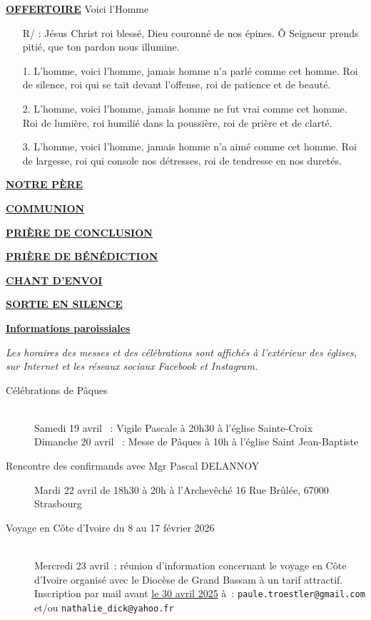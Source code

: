 \documentclass[11pt,a4paper]{article}
\newcommand{\NewsItem}[1]{%
\vspace{3pt}
\underline{\textbf{#1}}
		  }
\begin{document}
\NewsItem{OFFERTOIRE} Voici l'Homme
\begin{itemize}
\item[R/] : Jésus Christ roi blessé, Dieu couronné de nos épines.
Ô Seigneur prends pitié, que ton pardon nous illumine.
\item[1.] L’homme, voici l’homme, jamais homme n’a parlé comme cet homme.
Roi de silence, roi qui se tait devant l’offense, roi de patience et de beauté.
\item[2.] L’homme, voici l’homme, jamais homme ne fut vrai comme cet homme.
Roi de lumière, roi humilié dans la poussière, roi de prière et de clarté.
\item[3.] L’homme, voici l’homme, jamais homme n’a aimé comme cet homme.
Roi de largesse, roi qui console nos détresses, roi de tendresse en nos duretés.
\end{itemize}

\NewsItem{NOTRE PÈRE}


\begin{framed}
\NewsItem{COMMUNION} 
\end{framed}

\NewsItem{PRIÈRE DE CONCLUSION}

\NewsItem{PRIÈRE DE BÉNÉDICTION}

\NewsItem{CHANT D'ENVOI}


\NewsItem{SORTIE EN SILENCE}


\NewsItem{Informations paroissiales}

\textit{Les horaires des messes et des célébrations sont affichés à l’extérieur des églises, sur Internet et les réseaux sociaux Facebook et Instagram.}



\begin{framed}
\begin{description}
\item[Célébrations de Pâques]
~\\
Samedi 19 avril              : Vigile Pascale à 20h30 à l’église Sainte-Croix\\
Dimanche 20 avril         : Messe de Pâques à 10h à l’église Saint Jean-Baptiste
\item[Rencontre des confirmands avec Mgr Pascal DELANNOY]
Mardi 22 avril de 18h30 à 20h à l’Archevêché 16 Rue Brûlée, 67000 Strasbourg
\item[Voyage en Côte d’Ivoire du 8 au 17 février 2026]
~\\
Mercredi 23 avril : réunion d’information concernant le voyage en Côte d’Ivoire
organisé avec le Diocèse de Grand Bassam à un tarif attractif.
Inscription par mail avant \underline{le 30 avril 2025} à : \texttt{paule.troestler@gmail.com} et/ou   \texttt{nathalie\_dick@yahoo.fr}
\end{description}
\end{framed}
\end{document}
